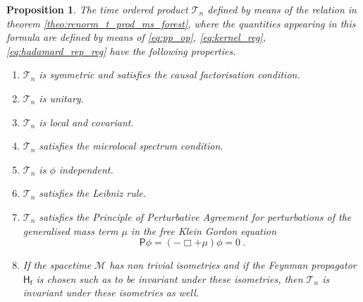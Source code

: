 \documentclass[11pt]{book}
\newcommand{\Mcal}{\mathcal{M}}
\newcommand{\Tcal}{\mathcal{T}}
\newcommand{\Hsf}{\mathsf{H}}
\newcommand{\Psf}{\mathsf{P}}
\newcommand{\fsf}{\mathsf{f}}
\theoremstyle{break}
\newtheorem{proposition}{Proposition}
\begin{document}
\begin{proposition}\label{prop:properties_scheme} 
The time ordered product $\Tcal_n$ defined by means of the relation in theorem \ref{theo:renorm_t_prod_ms_forest}, where the quantities appearing in this formula are defined by means of \eqref{eq:pp_op}, \eqref{eq:kernel_reg}, \eqref{eq:hadamard_rep_reg} have the following properties.
%
\begin{enumerate}
%
\item $\Tcal_n$ is symmetric and satisfies the causal factorisation condition.
%
\item $\Tcal_n$ is unitary.
%
\item $\Tcal_n$ is local and covariant.
%
\item $\Tcal_n$ satisfies the microlocal spectrum condition.
%
\item $\Tcal_n$ is $\phi$ independent.
%
\item $\Tcal_n$ satisfies the Leibniz rule.
%
\item $\Tcal_n$ satisfies the Principle of Perturbative Agreement for perturbations of the generalised mass term $\mu$ in the free Klein Gordon equation
%
\begin{equation*}
\Psf \phi = \left( - \Box + \mu \right) \phi = 0 \ . 
\end{equation*}
%
\item If the spacetime $\Mcal$ has non trivial isometries and if the Feynman propagator $\Hsf_\fsf$ is chosen such as to be invariant under these isometries, then $\Tcal_n$ is invariant under these isometries as well.
%
\end{enumerate}
%
\end{proposition}
\end{document}
